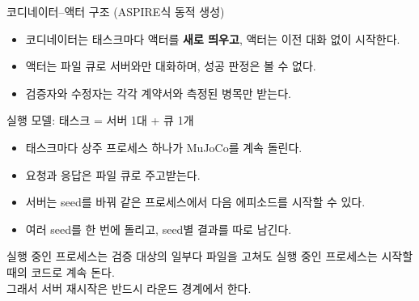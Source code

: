\documentclass[aspectratio=169,10pt]{beamer}
\begin{document}
\begin{frame}{코디네이터--액터 구조 (ASPIRE식 동적 생성)}
{}
  \vspace{0.2em}
  \begin{itemize}
    \item 코디네이터는 태스크마다 액터를 \textbf{새로 띄우고}, 액터는 이전 대화 없이 시작한다.
    \item 액터는 파일 큐로 서버와만 대화하며, 성공 판정은 볼 수 없다.
    \item 검증자와 수정자는 각각 계약서와 측정된 병목만 받는다.
  \end{itemize}
\end{frame}

\begin{frame}{실행 모델: 태스크 = 서버 1대 + 큐 1개}
  \begin{itemize}
    \item 태스크마다 상주 프로세스 하나가 MuJoCo를 계속 돌린다.
    \item 요청과 응답은 파일 큐로 주고받는다.
    \item 서버는 seed를 바꿔 같은 프로세스에서 다음 에피소드를 시작할 수 있다.
    \item 여러 seed를 한 번에 돌리고, seed별 결과를 따로 남긴다.
  \end{itemize}

  \vspace{0.5em}
  \begin{alertblock}{실행 중인 프로세스는 검증 대상의 일부다}
    파일을 고쳐도 실행 중인 프로세스는 시작할 때의 코드로 계속 돈다.\\
    그래서 서버 재시작은 반드시 라운드 경계에서 한다.
  \end{alertblock}
\end{frame}
\end{document}
